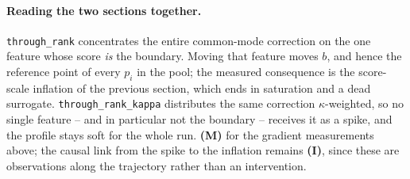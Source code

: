 \documentclass[11pt,a4paper]{article}
\newcommand{\code}[1]{\texttt{#1}}
\begin{document}
\paragraph{Reading the two sections together.}
\code{through\_rank} concentrates the entire common-mode correction on the one
feature whose score \emph{is} the boundary. Moving that feature moves $b$, and
hence the reference point of every $p_i$ in the pool; the measured
consequence is the score-scale inflation of the previous section, which ends
in saturation and a dead surrogate. \code{through\_rank\_kappa} distributes
the same correction $\kappa$-weighted, so no single feature -- and in
particular not the boundary -- receives it as a spike, and the profile stays
soft for the whole run. \textbf{(M)} for the gradient measurements above;
the causal link from the spike to the inflation remains \textbf{(I)}, since
these are observations along the trajectory rather than an intervention.
\end{document}
